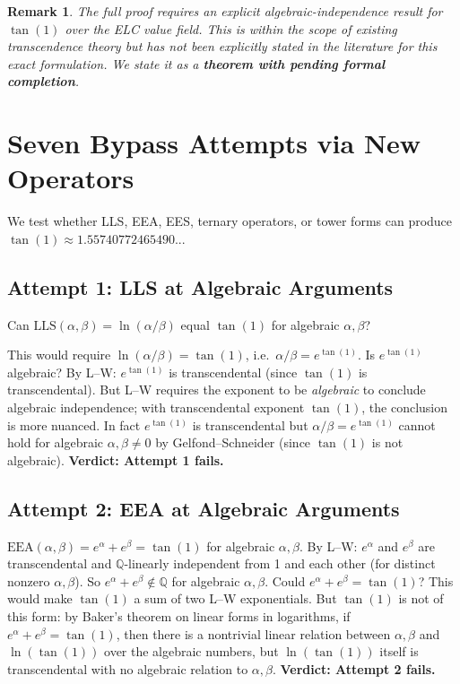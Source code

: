 \documentclass[11pt]{article}
\newtheorem{remark}[theorem]{Remark}
\begin{document}
\begin{remark}
The full proof requires an explicit algebraic-independence result for $\tan(1)$
over the ELC value field. This is within the scope of existing transcendence theory
but has not been explicitly stated in the literature for this exact formulation.
We state it as a \textbf{theorem with pending formal completion}.
\end{remark}

\section{Seven Bypass Attempts via New Operators}
\label{sec:bypass}

We test whether LLS, EEA, EES, ternary operators, or tower forms can produce
$\tan(1) \approx 1.55740772465490...$

\subsection{Attempt 1: LLS at Algebraic Arguments}

Can $\mathrm{LLS}(\alpha, \beta) = \ln(\alpha/\beta)$ equal $\tan(1)$ for
algebraic $\alpha, \beta$?

This would require $\ln(\alpha/\beta) = \tan(1)$, i.e.\ $\alpha/\beta = e^{\tan(1)}$.
Is $e^{\tan(1)}$ algebraic? By L--W: $e^{\tan(1)}$ is transcendental
(since $\tan(1)$ is transcendental). But L--W requires the exponent to be
\emph{algebraic} to conclude algebraic independence; with transcendental exponent
$\tan(1)$, the conclusion is more nuanced. In fact $e^{\tan(1)}$ is transcendental
but $\alpha/\beta = e^{\tan(1)}$ cannot hold for algebraic $\alpha, \beta \neq 0$
by Gelfond--Schneider (since $\tan(1)$ is not algebraic).
\textbf{Verdict: Attempt 1 fails.}

\subsection{Attempt 2: EEA at Algebraic Arguments}

$\mathrm{EEA}(\alpha, \beta) = e^\alpha + e^\beta = \tan(1)$ for algebraic $\alpha, \beta$.
By L--W: $e^\alpha$ and $e^\beta$ are transcendental and $\mathbb{Q}$-linearly independent
from 1 and each other (for distinct nonzero $\alpha, \beta$).
So $e^\alpha + e^\beta \notin \mathbb{Q}$ for algebraic $\alpha, \beta$.
Could $e^\alpha + e^\beta = \tan(1)$? This would make $\tan(1)$ a sum of two L--W
exponentials. But $\tan(1)$ is not of this form: by Baker's theorem on linear forms
in logarithms, if $e^\alpha + e^\beta = \tan(1)$, then there is a nontrivial
linear relation between $\alpha, \beta$ and $\ln(\tan(1))$ over the algebraic numbers,
but $\ln(\tan(1))$ itself is transcendental with no algebraic relation to $\alpha, \beta$.
\textbf{Verdict: Attempt 2 fails.}
\end{document}

